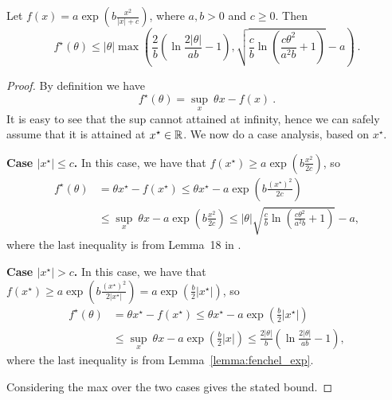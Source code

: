 \documentclass[12pt]{colt2018} %
\begin{document}
\begin{lemma}
\label{lemma:fenchel_exp2}
Let $f(x)=a \exp(b \frac{x^2}{|x|+c})$, where $a,b>0$ and $c\geq0$. Then 
\[
f^\star (\theta) 
\leq |\theta| 
\max\left(\frac{2}{b} \left(\ln \frac{2|\theta|}{a b}-1\right), \sqrt{\frac{c}{b} \ln\left(\frac{c \theta^2}{a^2 b}+1\right)}-a\right)~.
\]
\end{lemma}
%
\begin{proof}
By definition we have
\[
f^\star (\theta)= \sup_{x} \ \theta x - f(x)~.
\]
It is easy to see that the sup cannot attained at infinity, hence we can safely assume that it is attained at $x^\star \in \mathbb{R}$.
We now do a case analysis, based on $x^\star $.

\textbf{Case $|x^\star |\leq c$.} In this case, we have that $f(x^\star ) \geq a \exp(b \frac{x^2}{2c})$, so
\begin{align*}
f^\star (\theta) 
&= \theta x^\star  - f(x^\star ) 
\leq \theta x^\star  - a \exp\left(b \frac{(x^\star )^2}{2c}\right) \\
&\leq \sup_x \ \theta x - a \exp\left(b \frac{x^2}{2c}\right) 
\leq |\theta| \sqrt{\frac{c}{b} \ln\left(\frac{c \theta^2}{a^2 b}+1\right)}-a,
\end{align*}
where the last inequality is from Lemma~18 in \cite{orabona2016coin}.

\textbf{Case $|x^\star | > c$.}
In this case, we have that $f(x^\star ) \geq a \exp\left(b \tfrac{(x^\star )^2}{2|x^\star |}\right) = a \exp\left(\tfrac{b}{2} |x^\star |\right)$, so
\begin{align*}
f^\star (\theta) 
&= \theta x^\star  - f(x^\star ) 
\leq \theta x^\star  - a \exp\left(\frac{b}{2} |x^\star |\right) \\
&\leq \sup_x \ \theta x - a \exp\left(\frac{b}{2} |x|\right)
\leq \frac{2|\theta|}{b} \left(\ln\frac{2|\theta|}{a b}-1\right),
\end{align*}
where the last inequality is from Lemma~\ref{lemma:fenchel_exp}.

Considering the max over the two cases gives the stated bound.
\end{proof}
\end{document}
